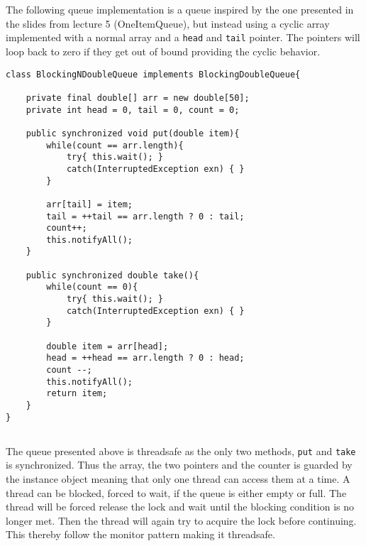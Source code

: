 \documentclass{ituhandin}
\begin{document}
\chapter{} %
\section{}

The following queue implementation is a queue inspired by the one presented in the slides from lecture 5 (OneItemQueue), but instead using a cyclic array implemented with a normal array and a \texttt{head} and \texttt{tail} pointer. The pointers will loop back to zero if they get out of bound providing the cyclic behavior.

\begin{lstlisting}[caption= Implementation of \texttt{BlockingNDoubleQueue} blocking fixed size queue]
class BlockingNDoubleQueue implements BlockingDoubleQueue{

    private final double[] arr = new double[50];
    private int head = 0, tail = 0, count = 0;

    public synchronized void put(double item){
        while(count == arr.length){
            try{ this.wait(); }
            catch(InterruptedException exn) { }
        }

        arr[tail] = item;
        tail = ++tail == arr.length ? 0 : tail;
        count++;
        this.notifyAll();
    }

    public synchronized double take(){
        while(count == 0){
            try{ this.wait(); }
            catch(InterruptedException exn) { }
        }

        double item = arr[head];
        head = ++head == arr.length ? 0 : head;
        count --;
        this.notifyAll();
        return item;
    }
}
\end{lstlisting}

\section{}
The queue presented above is threadsafe as the only two methods, \texttt{put} and \texttt{take} is synchronized. Thus  the array, the two pointers and the counter is guarded by the instance object meaning that only one thread can access them at a time. A thread can be blocked, forced to wait, if the queue is either empty or full. The thread will be forced release the lock and wait until the blocking condition is no longer met. Then the thread will again try to acquire the lock before continuing. This thereby follow the monitor pattern making it threadsafe. 
\end{document}
